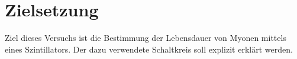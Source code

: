 \section{Zielsetzung}
\label{sec:Zielsetzung}

Ziel dieses Versuchs ist die Bestimmung der Lebensdauer von Myonen mittels eines Szintillators.
Der dazu verwendete Schaltkreis soll explizit erklärt werden.
